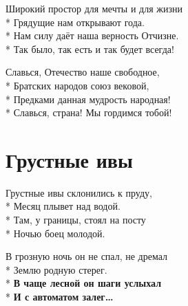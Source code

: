 \medskip

\begin{minipage}{\linewidth}
Широкий простор для мечты и для жизни\\*
Грядущие нам открывают года.\\*
Нам силу даёт наша верность Отчизне.\\*
Так было, так есть и так будет всегда!\\
\end{minipage}\par\medskip\nobreak

\medskip

\begin{minipage}{\linewidth}
\hspace*{1.5em}Славься, Отечество наше свободное,\\*
\hspace*{1.5em}Братских народов союз вековой,\\*
\hspace*{1.5em}Предками данная мудрость народная!\\*
\hspace*{1.5em}Славься, страна! Мы гордимся тобой!\\
\end{minipage}

\vspace{\fill}\newpage

\section{Грустные ивы}
\label{song:Грустные_ивы}

\medskip

\begin{minipage}{\linewidth}
Грустные ивы склонились к пруду,\\*
Месяц плывет над водой.\\*
Там, у границы, стоял на посту\\*
Ночью боец молодой.\\
\end{minipage}\par\medskip\nobreak

\medskip

\begin{minipage}{\linewidth}
В грозную ночь он не спал, не дремал\\*
Землю родную стерег.\\*
\textbf{В чаще лесной он шаги услыхал}\\*
\textbf{И с автоматом залег…}\\
\end{minipage}\par\medskip\nobreak

